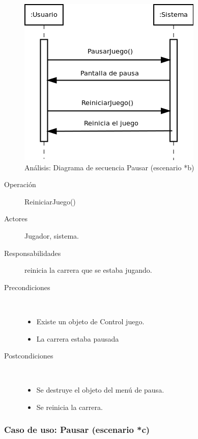 \begin{figure}[H] 
  \label{secuencia_pausar2}
  \begin{center}
    \includegraphics[scale=0.6]{imagenes/analisis/secuencia_pausar2.png}
  \end{center}
  \caption{Análisis: Diagrama de secuencia Pausar (escenario *b)}
\end{figure}

\begin{description}
    \item [Operación] ReiniciarJuego()
    \item [Actores] Jugador, sistema.
    \item [Responsabilidades] reinicia la carrera que se estaba jugando.
    \item [Precondiciones] $\quad$
        \begin{itemize}
            \item Existe un objeto de Control juego.
            \item La carrera estaba pausada
        \end{itemize}
    \item [Postcondiciones] $\quad$
        \begin{itemize}
            \item Se destruye el objeto del menú de pausa.
            \item Se reinicia la carrera.
        \end{itemize}
\end{description}

\subsubsection{Caso de uso: Pausar (escenario *c)}

